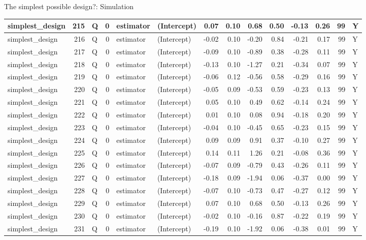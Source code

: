 \documentclass[
  11pt,
  ignorenonframetext,
]{beamer}
\begin{document}
\begin{frame}[fragile]{The simplest possible design?: Simulation}
\begin{tabular}{l|r|l|r|l|l|r|r|r|r|r|r|r|l}
\hline
simplest\_design & 215 & Q & 0 & estimator & (Intercept) & 0.07 & 0.10 & 0.68 & 0.50 & -0.13 & 0.26 & 99 & Y\\
\hline
simplest\_design & 216 & Q & 0 & estimator & (Intercept) & -0.02 & 0.10 & -0.20 & 0.84 & -0.21 & 0.17 & 99 & Y\\
\hline
simplest\_design & 217 & Q & 0 & estimator & (Intercept) & -0.09 & 0.10 & -0.89 & 0.38 & -0.28 & 0.11 & 99 & Y\\
\hline
simplest\_design & 218 & Q & 0 & estimator & (Intercept) & -0.13 & 0.10 & -1.27 & 0.21 & -0.34 & 0.07 & 99 & Y\\
\hline
simplest\_design & 219 & Q & 0 & estimator & (Intercept) & -0.06 & 0.12 & -0.56 & 0.58 & -0.29 & 0.16 & 99 & Y\\
\hline
simplest\_design & 220 & Q & 0 & estimator & (Intercept) & -0.05 & 0.09 & -0.53 & 0.59 & -0.23 & 0.13 & 99 & Y\\
\hline
simplest\_design & 221 & Q & 0 & estimator & (Intercept) & 0.05 & 0.10 & 0.49 & 0.62 & -0.14 & 0.24 & 99 & Y\\
\hline
simplest\_design & 222 & Q & 0 & estimator & (Intercept) & 0.01 & 0.10 & 0.08 & 0.94 & -0.18 & 0.20 & 99 & Y\\
\hline
simplest\_design & 223 & Q & 0 & estimator & (Intercept) & -0.04 & 0.10 & -0.45 & 0.65 & -0.23 & 0.15 & 99 & Y\\
\hline
simplest\_design & 224 & Q & 0 & estimator & (Intercept) & 0.09 & 0.09 & 0.91 & 0.37 & -0.10 & 0.27 & 99 & Y\\
\hline
simplest\_design & 225 & Q & 0 & estimator & (Intercept) & 0.14 & 0.11 & 1.26 & 0.21 & -0.08 & 0.36 & 99 & Y\\
\hline
simplest\_design & 226 & Q & 0 & estimator & (Intercept) & -0.07 & 0.09 & -0.79 & 0.43 & -0.26 & 0.11 & 99 & Y\\
\hline
simplest\_design & 227 & Q & 0 & estimator & (Intercept) & -0.18 & 0.09 & -1.94 & 0.06 & -0.37 & 0.00 & 99 & Y\\
\hline
simplest\_design & 228 & Q & 0 & estimator & (Intercept) & -0.07 & 0.10 & -0.73 & 0.47 & -0.27 & 0.12 & 99 & Y\\
\hline
simplest\_design & 229 & Q & 0 & estimator & (Intercept) & 0.07 & 0.10 & 0.68 & 0.50 & -0.13 & 0.26 & 99 & Y\\
\hline
simplest\_design & 230 & Q & 0 & estimator & (Intercept) & -0.02 & 0.10 & -0.16 & 0.87 & -0.22 & 0.19 & 99 & Y\\
\hline
simplest\_design & 231 & Q & 0 & estimator & (Intercept) & -0.19 & 0.10 & -1.92 & 0.06 & -0.38 & 0.01 & 99 & Y\\

\end{tabular}
\end{frame}
\end{document}
